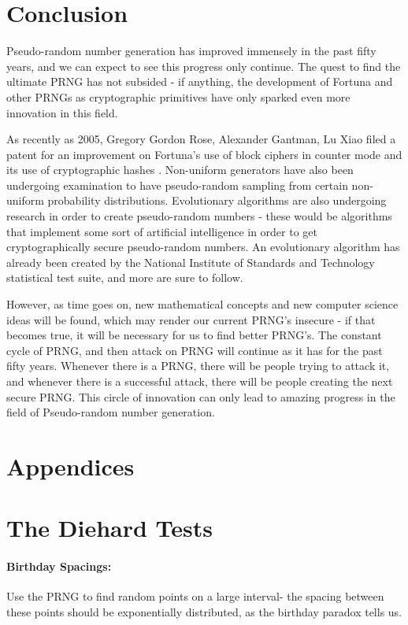 \documentclass[11pt]{article}
\begin{document}
\section{Conclusion}
Pseudo-random number generation has improved immensely in the past fifty years, and we can expect to see this progress only continue. The quest to find the ultimate PRNG has not subsided - if anything, the development of Fortuna and other PRNGs as cryptographic primitives have only sparked even more innovation in this field. 

As recently as 2005, Gregory Gordon Rose, Alexander Gantman, Lu Xiao filed a patent for an improvement on Fortuna's use of block ciphers in counter mode and its use of cryptographic hashes \cite{patent}. Non-uniform generators have also been undergoing examination to have pseudo-random sampling from certain non-uniform probability distributions. Evolutionary algorithms are also undergoing research in order to create pseudo-random numbers - these would be algorithms that implement some sort of artificial intelligence in order to get cryptographically secure pseudo-random numbers. An evolutionary algorithm has already been created by the National Institute of Standards and Technology statistical test suite, and more are sure to follow. 

However, as time goes on, new mathematical concepts and new computer science ideas will be found, which may render our current PRNG's insecure - if that becomes true, it will be necessary for us to find better PRNG's. The constant cycle of PRNG, and then attack on PRNG will continue as it has for the past fifty years. Whenever there is a PRNG, there will be people trying to attack it, and whenever there is a successful attack, there will be people creating the next secure PRNG. This circle of innovation can only lead to amazing progress in the field of Pseudo-random number generation. 






\appendix
\section{Appendices}
\section{The Diehard Tests}
\paragraph{Birthday Spacings:}
Use the PRNG to find random points on a large interval- the spacing between these points should be exponentially distributed, as the birthday paradox tells us.
\end{document}
